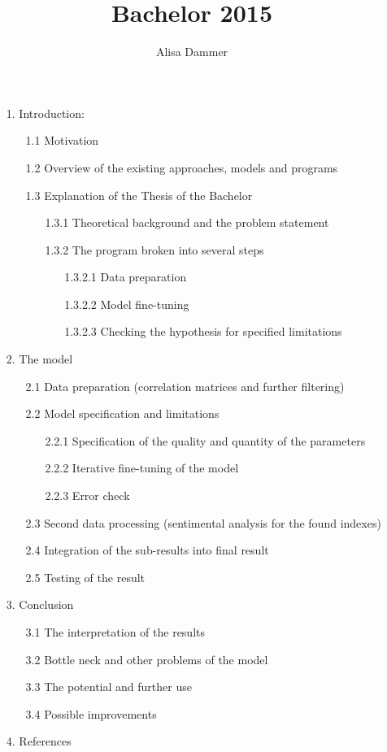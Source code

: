 \documentclass {article}
\title{Bachelor 2015}
\author{Alisa Dammer}
\begin{document}
\maketitle
 
\begin{enumerate}
	\item[1.] Introduction:
		\begin{enumerate}
			\item[1.1] Motivation
			\item[1.2] Overview of the existing approaches, models and programs
			\item[1.3] Explanation of the Thesis of the Bachelor
				\begin{enumerate}
					\item[1.3.1] Theoretical background and the problem statement
					\item[1.3.2] The program broken into several steps
						\begin{enumerate}
							\item[1.3.2.1] Data preparation
							\item[1.3.2.2] Model fine-tuning
							\item[1.3.2.3] Checking the hypothesis for specified limitations
						\end{enumerate}
				\end{enumerate} 
		\end{enumerate}
	\item[2.] The model
		\begin{enumerate}
			\item[2.1] Data preparation (correlation matrices and further filtering)
			\item[2.2] Model specification and limitations
				\begin{enumerate}
					\item[2.2.1] Specification of the quality and quantity of the parameters
					\item[2.2.2] Iterative fine-tuning of the model 
					\item[2.2.3] Error check
				\end{enumerate}
			\item[2.3] Second data processing (sentimental analysis for the found indexes)
			\item[2.4] Integration of the sub-results into final result
			\item[2.5] Testing of the result
		\end{enumerate}
	\item[3.] Conclusion
		\begin{enumerate}
			\item[3.1] The interpretation of the results
			\item[3.2] Bottle neck and other problems of the model
			\item[3.3] The potential and further use
			\item[3.4] Possible improvements
		\end{enumerate}
	\item[4.] References
\end{enumerate}
\end{document}

